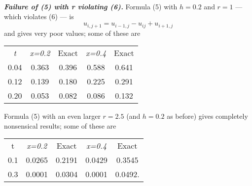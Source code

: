 \newline
\textit{\textbf{Failure of (5) with r violating (6).}} Formula (5) with $h=0.2$ and $r=1$ --- which violates (6) --- is
\begin{equation*}
u_{i,j+1}=u_{i-1,j}-u_{ij}+u_{i+1,j}
\end{equation*}
and gives very poor values; some of these are
\begin{table}[htp]
\begin{center}
\begin{tabular}{c c c c c}
\textit{t} & \textit{x=0.2} & Exact &\textit{x=0.4} & Exact \\
0.04 & 0.363 & 0.396 & 0.588 & 0.641 \\
0.12 & 0.139 & 0.180 & 0.225 & 0.291 \\
0.20 & 0.053 & 0.082 & 0.086 & 0.132 \\
\end{tabular}
\end{center}
\end{table}%
\newline
Formula (5) with an even larger $r=2.5$ (and $h=0.2$ as before) gives completely nonsensical results; some of these are \\
\begin{table}[htp]
\begin{center}
\begin{tabular}{c c c c c}
t & \textit{x=0.2} & Exact & \textit{x=0.4} & Exact \\
0.1 & 0.0265 & 0.2191 & 0.0429 & 0.3545 \\
0.3 & 0.0001 & 0.0304 & 0.0001 & 0.0492.
\end{tabular}
\end{center}
\ebox
\end{table}%
\newpage


